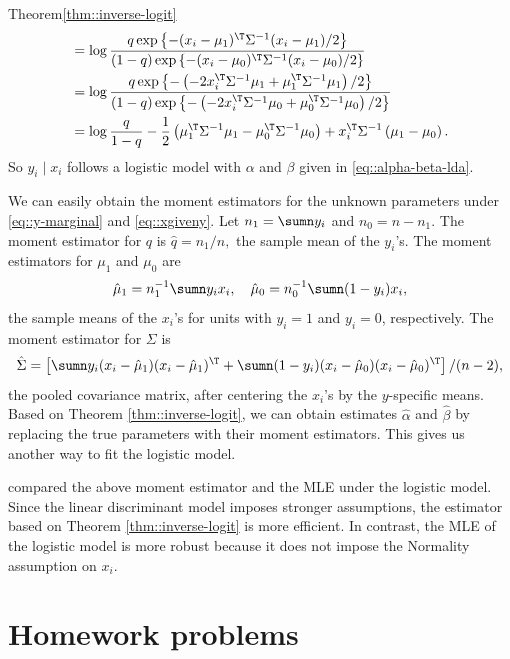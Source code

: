 \begin{myproof}{Theorem}{\ref{thm::inverse-logit}}
\begin{align*}
&=\log \frac{q\exp\left\{ -(x_{i}-\mu_{1})^{\T}\Sigma^{-1}(x_{i}-\mu_{1})/2\right\}}
{  (1-q) \exp\left\{ -(x_{i}-\mu_{0})^{\T}\Sigma^{-1}(x_{i}-\mu_{0})/2\right\}  }\\
& =\log\frac{q\exp\left\{ -\left(-2x_{i}^{\T}\Sigma^{-1}\mu_{1}+\mu_{1}^{\T}\Sigma^{-1}\mu_{1}\right)/2\right\} }{(1-q)\exp\left\{ -\left(-2x_{i}^{\T}\Sigma^{-1}\mu_{0}+\mu_{0}^{\T}\Sigma^{-1}\mu_{0}\right)/2\right\} }\\
 & = \log\frac{q}{1-q}-\frac{1}{2}\left(\mu_{1}^{\T}\Sigma^{-1}\mu_{1}-\mu_{0}^{\T}\Sigma^{-1}\mu_{0}\right)+x_{i}^{\T}\Sigma^{-1}\left(\mu_{1}-\mu_{0}\right) . 
\end{align*}
So $y_{i}\mid x_{i}$ follows a logistic model with
$\alpha$ and $\beta$ given in \eqref{eq::alpha-beta-lda}. 
\end{myproof}


We can easily obtain the moment estimators for the unknown parameters under \eqref{eq::y-marginal} and \eqref{eq::xgiveny}. Let $n_1 = \sumn y_i$ and $n_0 = n-n_1$. The moment estimator for $q$ is 
$
\hat{q} = n_1/n,
$
the sample mean of the $y_i$'s. The moment estimators for $\mu_1$ and $\mu_0$ are
$$
\hat{\mu}_1 = n_1^{-1} \sumn  y_i x_i,\quad \hat{\mu}_0 = n_0^{-1} \sumn (1-y_i) x_i, 
$$
the sample means of the $x_i$'s for units with $y_i=1$ and $y_i=0$, respectively. The moment estimator for $\Sigma$ is 
$$
\hat{\Sigma} = \left[ 
\sumn y_i (x_i -\hat{\mu}_1  )(x_i-\hat{\mu}_1 )^{\T} +  \sumn (1-y_i) (x_i -\hat{\mu}_0  )(x_i-\hat{\mu}_0 )^{\T}
\right] /(n-2) ,
$$
the pooled covariance matrix, after centering the $x_i$'s by the $y$-specific means. 
Based on Theorem \ref{thm::inverse-logit}, we can obtain estimates $\hat{\alpha}$ and $\hat{\beta}$ by replacing the true parameters with their moment estimators. This gives us another way to fit the logistic model. 

\citet{efron1975efficiency} compared the above moment estimator and the MLE under the logistic model. Since the linear discriminant model imposes stronger assumptions, the estimator based on Theorem \ref{thm::inverse-logit} is more efficient. In contrast, the MLE of the logistic model is more robust because it does not impose the Normality assumption on $x_i$.   




\section{Homework problems}




